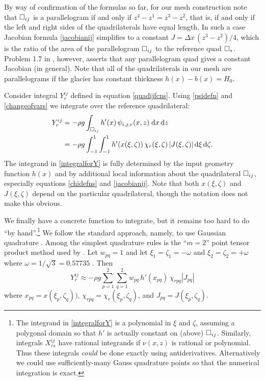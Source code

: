 \documentclass[11pt,final,reqno]{amsart}
\theoremstyle{remark}
\theoremstyle{definition}
\begin{document}
By way of confirmation of the formulas so far, for our mesh construction note that $\square_{ij}$ is a parallelogram if and only if $z^4-z^1=z^3-z^2$, that is, if and only if the left and right sides of the quadrilaterals have equal length.  In such a case Jacobian formula \eqref{jacobianij} simplifies to a constant $J = \Delta x\,(z^3 - z^2) / 4$, which is the ratio of the area of the parallelogram $\square_{ij}$ to the reference quad $\square_{\ast}$.  Problem 1.7 in \cite{Elmanetal2005}, however, asserts that any parallelogram quad gives a constant Jacobian (in general).  Note that all of the quadrilaterals in our mesh are parallelograms if the glacier has constant thickness $h(x)-b(x)=H_0$.

\newcommand{\Jdd}{\,|J(\xi,\zeta)|\dxidzeta}
\newcommand{\Jpq}{J(\xi_p,\zeta_q)}

Consider integral $Y^{ij}_r$ defined in equation \eqref{quadijfcns}.  Using \eqref{psidefn} and \eqref{changeofvars} we integrate over the reference quadrilateral:
\begin{align}
  Y^{ij}_r &= -\rho g \int_{\quadij} h'(x)\,\psi_{i,j,r}(x,z) \dxdz \notag \\
           &= -\rho g \int_{-1}^1 \int_{-1}^1 h'(x(\xi,\zeta))\,\chi_r(\xi,\zeta) \Jdd. \label{integralforY}
\end{align}
The integrand in \eqref{integralforY} is fully determined by the input geometry function $h(x)$ and by additional local information about the quadrilateral $\square_{ij}$, especially equations \eqref{chidefns} and \eqref{jacobianij}.  Note that both $x(\xi,\zeta)$ and $J(\xi,\zeta)$ depend on the particular quadrilateral, though the notation does not make this obvious.

We finally have a concrete function to integrate, but it remains too hard to do ``by hand''.\footnote{The integrand in \eqref{integralforY} is a polynomial in $\xi$ and $\zeta$, assuming a polygonal domain so that $h'$ is actually constant on (above) $\square_{ij}$.  Similarly, integrals $X^{ij}_{rs}$ have rational integrands if $\nu(x,z)$ is rational or polynomial.  Thus these integrals \emph{could} be done exactly using antiderivatives.  Alternatively we could use sufficiently-many Gauss quadrature points so that the numerical integration is exact.}  We follow the standard approach, namely, to use Gaussian quadrature \cite[subsection 1.4.2]{Elmanetal2005}.  Among the simplest quadrature rules is the ``$m=2$'' point tensor product method used by \cite{BrownSmithAhmadia}.  Let $w_{pq}=1$ and let $\xi_1=\zeta_1=-\omega$ and $\xi_2=\zeta_2=+\omega$ where $\omega=1/\sqrt{3}=0.57735$ \cite[compare $m=2$ cases of Figure 1.15 and formula (1.52)]{Elmanetal2005}.  Then
\begin{equation}
  Y^{ij}_r \approx -\rho g \sum_{p=1}^2 \sum_{q=1}^2 w_{pq}\, h'(x_{pq})\,\chi_{rpq} |J_{pq}| \label{Yapprox}
\end{equation}
where $x_{pq} = x(\xi_p,\zeta_q))$, $\chi_{rpq} = \chi_r(\xi_p,\zeta_q)$, and $J_{pq}=\Jpq$.
\end{document}
